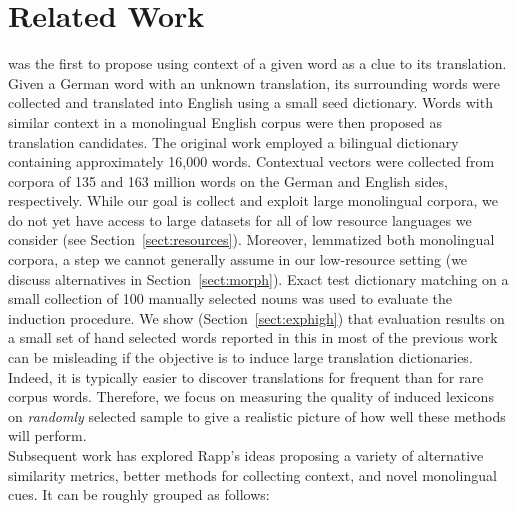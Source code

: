 \documentclass{article}
\newcommand{\secref}[1]{Section~\ref{#1}}
\begin{document}
\section{Related Work} \label{sect:relwork}


\cite{Rapp:1995} was the first to propose using context of a given word as a clue to its translation. Given a German word with an unknown translation, its surrounding words were collected and translated into English using a small seed dictionary.  Words with similar context in a monolingual English corpus were then proposed as translation candidates.  The original work employed a bilingual dictionary containing approximately 16,000 words.  Contextual vectors were collected from corpora of 135 and 163 million words on the German and English sides, respectively.  While our goal is collect and exploit large monolingual corpora, we do not yet have access to large datasets for all of low resource languages we consider (see \secref{sect:resources}).  Moreover, \cite{Rapp:1995} lemmatized both monolingual corpora, a step we cannot generally assume in our low-resource setting (we discuss alternatives in \secref{sect:morph}).  Exact test dictionary matching on a small collection of 100 manually selected nouns was used to evaluate the induction procedure.  We show  (\secref{sect:exphigh}) that evaluation results on a small set of hand selected words reported in this in most of the previous work can be misleading if the objective is to induce large translation dictionaries.  Indeed, it is typically easier to discover translations for frequent than for rare corpus words.  Therefore, we focus on measuring the quality of induced lexicons on {\em randomly} selected sample to give a realistic picture of how well these methods will perform.\\

Subsequent work has explored Rapp's ideas proposing a variety of alternative similarity metrics, better methods for collecting context, and novel monolingual cues.  It can be roughly grouped as follows:
\end{document}
